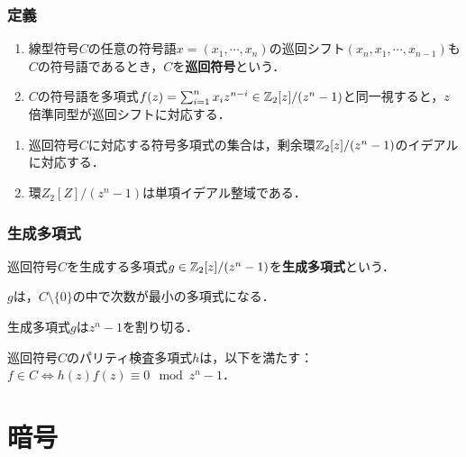 \documentclass[uplatex,dvipdfmx]{jsreport}
\begin{document}
\subsection{定義}

\begin{definition}\mbox{}
    \begin{enumerate}
        \item 線型符号$C$の任意の符号語$x=(x_1,\cdots,x_n)$の巡回シフト$(x_n,x_1,\cdots,x_{n-1})$も$C$の符号語であるとき，$C$を\textbf{巡回符号}という．
        \item $C$の符号語を多項式$f(z)=\sum^n_{i=1}x_iz^{n-i}\in\mathbb{Z}_2[z]/(z^n-1)$と同一視すると，$z$倍準同型が巡回シフトに対応する．
    \end{enumerate}
\end{definition}

\begin{proposition}\mbox{}
    \begin{enumerate}
        \item 巡回符号$C$に対応する符号多項式の集合は，剰余環$\mathbb{Z}_2[z]/(z^n-1)$のイデアルに対応する．
        \item 環$Z_2[Z]/(z^n-1)$は単項イデアル整域である．
    \end{enumerate}
\end{proposition}

\subsection{生成多項式}

\begin{definition}
    巡回符号$C$を生成する多項式$g\in\mathbb{Z}_2[z]/(z^n-1)$を\textbf{生成多項式}という．
\end{definition}

\begin{lemma}
    $g$は，$C\setminus\{0\}$の中で次数が最小の多項式になる．
\end{lemma}

\begin{theorem}
    生成多項式$g$は$z^n-1$を割り切る．
\end{theorem}

\begin{theorem}
    巡回符号$C$のパリティ検査多項式$h$は，以下を満たす：$f\in C\Leftrightarrow h(z)f(z)\equiv 0\mod z^n-1$．
\end{theorem}

\chapter{暗号}
\end{document}
